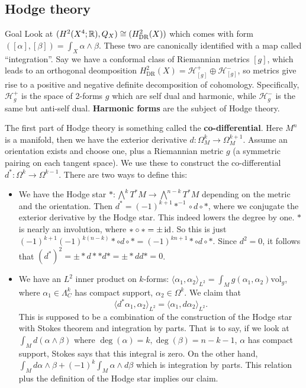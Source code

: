 \subsection{Hodge theory}
\begin{namedthing}{Goal} 
    Look at $(H^2(X^4;\mathbb{R}) ,Q_X) \cong  (H^2_{\mathrm{DR}}(X))$  which comes with form $\left( [\alpha ],[\beta ] \right)= \int_X \alpha \wedge \beta  $. These two are canonically identified with a map called ``integration''. Say we have a conformal class of Riemannian metrics $[g]$, which leads to an orthogonal deomposition $H^2_{\mathrm{DR}}(X) = \mathcal H^+ _{[g]}\oplus \mathcal H^- _{[g]}$, so metrics give rise to a positive and negative definite decomposition of cohomology. Specifically, $\mathcal H_g^+$ is the space of  2-forms  $g$ which are self dual and harmonic, while $\mathcal H^- _g$ is the same but anti-self dual.  \textbf{Harmonic forms} are the subject of Hodge theory.
\end{namedthing}

The first part of Hodge theory is something called the \textbf{co-differential}. Here $M^n $ is a manifold, then we have the exterior derivative $d \colon \Omega^k _M \to \Omega^{k+1}_M$. Assume an orientation exists and choose one, plus a Riemannian metric $g$ (a symmetric pairing on each tangent space). We use these to construct the co-differential $d^* \colon \Omega^k \to \Omega^{k-1}$. There are two ways to define this:
\begin{itemize}
\setlength\itemsep{-.2em}
    \item We have the Hodge star $* \colon \bigwedge^k T^*M \to \bigwedge ^{n-k}T^*M$ depending on the metric and the orientation. Then $d^* = \left( -1 \right) ^{k+1}* ^{-1} \circ d \circ *$, where we conjugate the exterior derivative by the Hodge star. This indeed lowers the degree by one. $*$ is nearly an involution, where $* \circ * = \pm \operatorname{id}$. So this is just $\left( -1 \right) ^{k+1}(-1) ^{k(n-k)}* \circ d \circ * =\boxed{  (-1)^{kn+1} * \circ d \circ *}$. Since $d^2=0$, it follows that $\left( d^* \right) ^2 = \pm * d * * d * = \pm * d d * = 0$.
    \item We have an $L^2$ inner product on $k$-forms: $ \langle  \alpha_1, \alpha_2\rangle _{L^2}= \int _M g(\alpha_1,\alpha_2) \mathrm{vol}_g$, where $\alpha_1 \in  \Lambda^k_C$ has compact support, $\alpha_2 \in \Omega^k$. We claim that \[
    \langle d^* \alpha_1, \alpha_2 \rangle _{L^2}= \langle \alpha_1, d\alpha_2 \rangle _{L^2}.
\] This is supposed to be a combination of the construction of the Hodge star with Stokes theorem and integration by parts. That is to say, if we look at $\int_M d(\alpha \wedge \beta )$ where $\deg(\alpha )=k, \deg(\beta )=n-k-1$, $\alpha $ has compact support, Stokes says that this integral is zero. On the other hand,  $\int_M d \alpha \wedge \beta  + (-1)^k \int _M \alpha  \wedge d \beta $ which is integration by parts. This relation plus the definition of the Hodge star implies our claim.
\end{itemize} 

